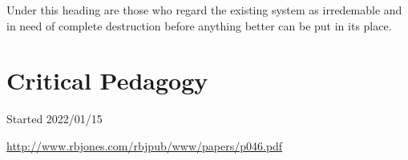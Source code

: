 \documentclass[10pt,titlepage]{article}
\begin{document}
Under this heading are those who regard the existing system as irredemable and in need of complete destruction before anything better can be put in its place.



\cite{pluckrose-cynical,lindsay-racemarx,friere-poled,gottesman-criturn}

\appendix

\section{Critical Pedagogy}


\cite{friere-poled,gottesman-criturn}


{}





\tiny{
Started 2022/01/15


\href{http://www.rbjones.com/rbjpub/www/papers/p046.pdf}{http://www.rbjones.com/rbjpub/www/papers/p046.pdf}

}%
\end{document}
